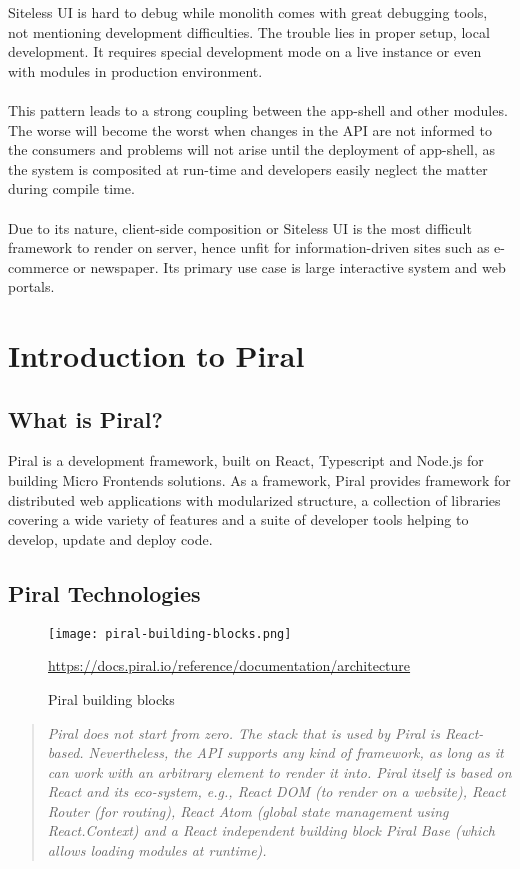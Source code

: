 \documentclass[a4paper]{book}
\begin{document}
Siteless UI is hard to debug while monolith comes with great debugging tools, not mentioning development difficulties. The trouble lies in proper setup, local development. It requires special development mode on a live instance or even with modules in production environment.
\\ \\ 
This pattern leads to a strong coupling between the app-shell and other modules. The worse will become the worst when changes in the API are not informed to the consumers and problems will not arise until the deployment of app-shell, as the system is composited at run-time and developers easily neglect the matter during compile time.
\\ \\
Due to its nature, client-side composition or Siteless UI is the most difficult framework to render on server, hence unfit for information-driven sites such as e-commerce or newspaper. Its primary use case is large interactive system and web portals.

\section{Introduction to Piral } \label{Introduction to Piral}
\subsection{What is Piral?}
Piral is a development framework, built on React, Typescript and Node.js for building Micro Frontends solutions. As a framework, Piral provides framework for distributed web applications with modularized structure, a collection of libraries covering a wide variety of features and a suite of developer tools helping to develop, update and deploy code.

\subsection{Piral Technologies}

\begin{figure}[h!]
  \centering
  \captionsetup{justification=centering}
  \texttt{[image: piral-building-blocks.png]}
  \caption{Piral building blocks}
  \url{https://docs.piral.io/reference/documentation/architecture}
  \label{fig:piral-standard}
\end{figure}

\begin{quote}
\textit{
    Piral does not start from zero. The stack that is used by Piral is React-based. Nevertheless, the API supports any kind of framework, as long as it can work with an arbitrary element to render it into. Piral itself is based on React and its eco-system, e.g., React DOM (to render on a website), React Router (for routing), React Atom (global state management using React.Context) and a React independent building block Piral Base (which allows loading modules at runtime). 
} \cite{PiralGettingStarted}
\end{quote} 
\end{document}
